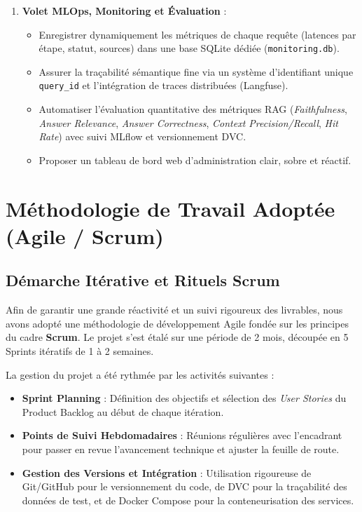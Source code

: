 \begin{enumerate}
    \item \textbf{Volet MLOps, Monitoring et Évaluation} :
    \begin{itemize}
        \item Enregistrer dynamiquement les métriques de chaque requête (latences par étape, statut, sources) dans une base SQLite dédiée (\texttt{monitoring.db}).
        \item Assurer la traçabilité sémantique fine via un système d'identifiant unique \texttt{query\_id} et l'intégration de traces distribuées (Langfuse).
        \item Automatiser l'évaluation quantitative des métriques RAG (\textit{Faithfulness}, \textit{Answer Relevance}, \textit{Answer Correctness}, \textit{Context Precision/Recall}, \textit{Hit Rate}) avec suivi MLflow et versionnement DVC.
        \item Proposer un tableau de bord web d'administration clair, sobre et réactif.
    \end{itemize}
\end{enumerate}

\section{Méthodologie de Travail Adoptée (Agile / Scrum)}

\subsection{Démarche Itérative et Rituels Scrum}
Afin de garantir une grande réactivité et un suivi rigoureux des livrables, nous avons adopté une méthodologie de développement Agile fondée sur les principes du cadre \textbf{Scrum}. Le projet s'est étalé sur une période de 2 mois, découpée en 5 Sprints itératifs de 1 à 2 semaines.

La gestion du projet a été rythmée par les activités suivantes :
\begin{itemize}
    \item \textbf{Sprint Planning} : Définition des objectifs et sélection des \textit{User Stories} du Product Backlog au début de chaque itération.
    \item \textbf{Points de Suivi Hebdomadaires} : Réunions régulières avec l'encadrant pour passer en revue l'avancement technique et ajuster la feuille de route.
    \item \textbf{Gestion des Versions et Intégration} : Utilisation rigoureuse de Git/GitHub pour le versionnement du code, de DVC pour la traçabilité des données de test, et de Docker Compose pour la conteneurisation des services.
\end{itemize}

